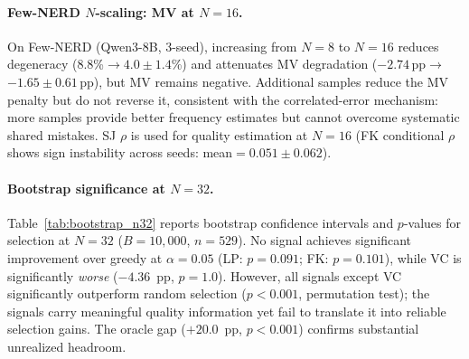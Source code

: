 \paragraph{Few-NERD $N$-scaling: MV at $N{=}16$.}
On Few-NERD (Qwen3-8B, 3-seed), increasing from $N{=}8$ to $N{=}16$ reduces degeneracy ($8.8$\%$\to$$4.0{\pm}1.4$\%) and attenuates MV degradation ($-2.74$\,pp$\to$$-1.65{\pm}0.61$\,pp), but MV remains negative.
Additional samples reduce the MV penalty but do not reverse it, consistent with the correlated-error mechanism: more samples provide better frequency estimates but cannot overcome systematic shared mistakes.
SJ $\rho$ is used for quality estimation at $N{=}16$ (FK conditional $\rho$ shows sign instability across seeds: mean${=}0.051{\pm}0.062$).

\begin{table}[t]
\centering
\small
\caption{Effect of sample count on selection (SciERC NER, Qwen3-8B, $T{=}1.0$, gold-filtered, seed${=}42$; exp\_025).\protect\footnotemark\ ``Best $\Delta$'': highest selection gain across all 5 signals. Per-signal $\Delta$ in pp vs.~greedy.}
\label{tab:n_scaling_selection}
\end{table}

\paragraph{Bootstrap significance at $N{=}32$.}
Table~\ref{tab:bootstrap_n32} reports bootstrap confidence intervals and $p$-values for selection at $N{=}32$ ($B{=}10{,}000$, $n{=}529$).
No signal achieves significant improvement over greedy at $\alpha{=}0.05$ (LP: $p{=}0.091$; FK: $p{=}0.101$), while VC is significantly \textit{worse} ($-4.36$~pp, $p{=}1.0$).
However, all signals except VC significantly outperform random selection ($p{<}0.001$, permutation test); the signals carry meaningful quality information yet fail to translate it into reliable selection gains.
The oracle gap ($+20.0$~pp, $p{<}0.001$) confirms substantial unrealized headroom.

